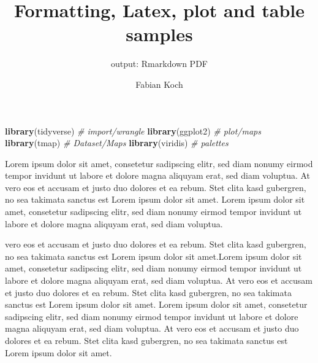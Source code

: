 \documentclass[
]{article}
\title{Formatting, Latex, plot and table samples}
\subtitle{output: Rmarkdown PDF}
\author{Fabian Koch}
\date{}
\newenvironment{Shaded}{\begin{snugshade}}{\end{snugshade}}
\newcommand{\CommentTok}[1]{\textcolor[rgb]{0.56,0.35,0.01}{\textit{#1}}}
\newcommand{\KeywordTok}[1]{\textcolor[rgb]{0.13,0.29,0.53}{\textbf{#1}}}
\newcommand{\NormalTok}[1]{#1}
\newcommand{\OperatorTok}[1]{\textcolor[rgb]{0.81,0.36,0.00}{\textbf{#1}}}
\newcommand{\StringTok}[1]{\textcolor[rgb]{0.31,0.60,0.02}{#1}}
\begin{document}
\maketitle

\begin{Shaded}
\begin{Highlighting}[]
\KeywordTok{library}\NormalTok{(tidyverse) }\CommentTok{# import/wrangle}
\KeywordTok{library}\NormalTok{(ggplot2) }\CommentTok{# plot/maps}
\KeywordTok{library}\NormalTok{(tmap) }\CommentTok{# Dataset/Maps}
\KeywordTok{library}\NormalTok{(viridis) }\CommentTok{# palettes}
\end{Highlighting}
\end{Shaded}

\begin{Shaded}
\end{Shaded}

\newpage

Lorem ipsum dolor sit amet, consetetur sadipscing elitr, sed diam nonumy
eirmod tempor invidunt ut labore et dolore magna aliquyam erat, sed diam
voluptua. At vero eos et accusam et justo duo dolores et ea rebum. Stet
clita kasd gubergren, no sea takimata sanctus est Lorem ipsum dolor sit
amet. Lorem ipsum dolor sit amet, consetetur sadipscing elitr, sed diam
nonumy eirmod tempor invidunt ut labore et dolore magna aliquyam erat,
sed diam voluptua.

vero eos et accusam et justo duo dolores et ea rebum. Stet clita kasd
gubergren, no sea takimata sanctus est Lorem ipsum dolor sit amet.Lorem
ipsum dolor sit amet, consetetur sadipscing elitr, sed diam nonumy
eirmod tempor invidunt ut labore et dolore magna aliquyam erat, sed diam
voluptua. At vero eos et accusam et justo duo dolores et ea rebum. Stet
clita kasd gubergren, no sea takimata sanctus est Lorem ipsum dolor sit
amet. Lorem ipsum dolor sit amet, consetetur sadipscing elitr, sed diam
nonumy eirmod tempor invidunt ut labore et dolore magna aliquyam erat,
sed diam voluptua. At vero eos et accusam et justo duo dolores et ea
rebum. Stet clita kasd gubergren, no sea takimata sanctus est Lorem
ipsum dolor sit amet.
\end{document}

